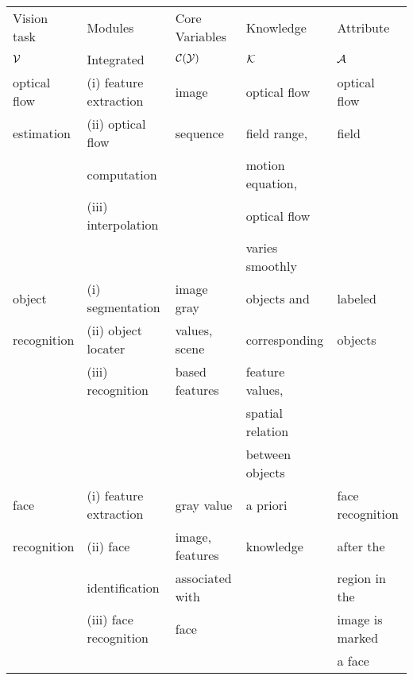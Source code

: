 {\newpage
\clearpage
\samepage \begin{table}%
\begin{center}
 
 \begin{tabular}{||l||l|l|l|l||} \hline \hline
 Vision task & Modules               & Core Variables & Knowledge    & Attribute  \\ 
 ${\cal{V}}$        & Integrated            &  ${\cal{C(Y)}}$          &    ${\cal{K}}$      & ${\cal{A}}$        \\  \hline \hline
 optical flow&(i) feature extraction & image          & optical flow  & optical flow \\  
 estimation  &(ii) optical flow      & sequence       & field range,  & field        \\ 
             &computation            &                & motion equation,&            \\  
             &(iii) interpolation    &                & optical flow  &              \\   
             &                       &                & varies smoothly&             \\   \hline
 object      &(i) segmentation       & image gray     & objects and   & labeled      \\    
 recognition &(ii) object locater    & values, scene  & corresponding & objects \\    
             &(iii) recognition      & based features & feature values,&             \\    
             &                       &                & spatial relation&            \\    
             &                       &                & between objects&             \\    \hline
%

 face        & (i) feature extraction& gray value     & a priori      & face recognition\\ 
 recognition &(ii) face              & image, features& knowledge     & after the    \\    
             &  identification       & associated with&               & region in the\\    
             & (iii) face recognition& face           &               & image is marked\\ 
             &                       &                &               & a face \\   \hline\hline
 \end{tabular}
 
 \label{tab:future}
 \end{center}
 
 \end{table}
}

